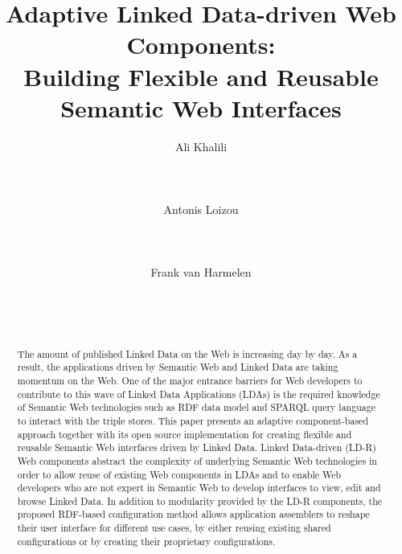 \documentclass{acm_proc_article-sp}
\begin{document}
\title{Adaptive Linked Data-driven Web Components:\\ Building Flexible and Reusable Semantic Web Interfaces}
\subtitle{}

\author{
\alignauthor
Ali Khalili\\
       \\
       \\
       \\
\alignauthor
Antonis Loizou\\
       \\
       \\
       \\
\alignauthor
Frank van Harmelen\\
       \\
       \\
       \\
}


\maketitle
\begin{abstract}
The amount of published Linked Data on the Web is increasing day by day.
As a result, the applications driven by Semantic Web and Linked Data are taking momentum on the Web.
One of the major entrance barriers for Web developers to contribute to this wave of Linked Data Applications (LDAs) is the required knowledge of Semantic Web technologies such as RDF data model and SPARQL query language to interact with the triple stores.
This paper presents an adaptive component-based approach together with its open source implementation for creating flexible and reusable Semantic Web interfaces driven by Linked Data.
Linked Data-driven (LD-R) Web components abstract the complexity of underlying Semantic Web technologies in order to allow reuse of existing Web components in LDAs and to enable Web developers who are not expert in Semantic Web to develop interfaces to view, edit and browse Linked Data.
In addition to modularity provided by the LD-R components, the proposed RDF-based configuration method allows application assemblers to reshape their user interface for different use cases, by either reusing existing shared configurations or by creating their proprietary configurations.

\end{abstract}
\end{document}
